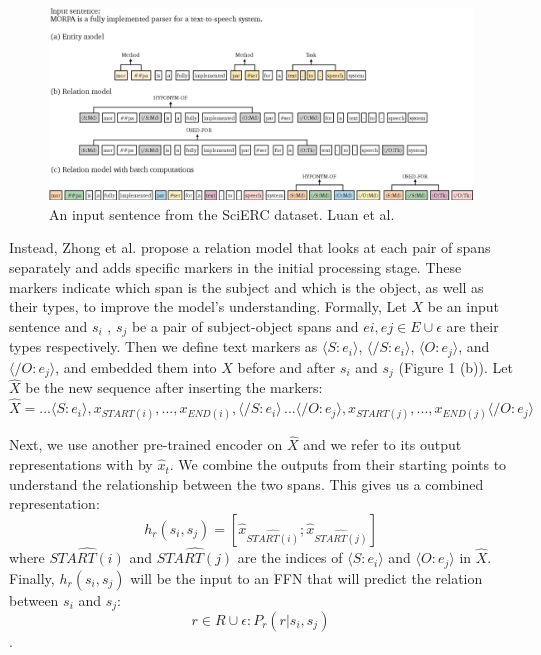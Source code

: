 \begin{figure}[ht]
    \centering
    \includegraphics[width=1\textwidth]{figures/figure1.png}
    \caption{An input sentence from the SciERC dataset. Luan et al. \cite{luan-etal-2019-general}}
    \label{fig:examplefromsciercdataset}
\end{figure}

Instead, Zhong et al. \cite{Zhong2020AFE} propose a relation model that looks at each pair of spans separately and adds specific markers in the initial processing stage. These markers indicate which span is the subject and which is the object, as well as their types, to improve the model's understanding. Formally, Let \(X\) be an input sentence and \(s_i\) , \(s_j\) be a pair of subject-object spans and \(ei , ej \in E \cup {\epsilon}\) are their types respectively. Then we define text markers as \(\langle S:e_i\rangle\), \(\langle /S:e_i\rangle\), \(\langle O:e_j\rangle\), and \(\langle /O:e_j\rangle\), and embedded them into \(X\) before and after \(s_i\) and \(s_j\) (Figure 1 (b)). Let \(\widehat{X}\) be the new sequence after inserting the markers: \[\widehat{X} = ...\langle S:e_i\rangle,x_{START(i)},...,x_{END(i)},\langle /S:e_i\rangle\,...\langle /O:e_j\rangle,x_{START(j)},...,x_{END(j)}\langle /O:e_j\rangle\]

Next, we use another pre-trained encoder on \(\widehat{X}\) and we refer to its output representations with by \(\widehat{x}_t\). We combine the outputs from their starting points to understand the relationship between the two spans. This gives us a combined representation: \[h_r(s_i,s_j)=[{\widehat{x}}_{\widehat{START(i)}};{\widehat{x}}_{\widehat{START(j)}}]\]
where \(\widehat{START(i)}\) and \(\widehat{START(j)}\) are the indices of \(\langle S:e_i\rangle\) and \(\langle O:e_j\rangle\) in \(\widehat{X}\). Finally, \(h_r(s_i,s_j)\) will be the input to an FFN that will predict the relation between \(s_i\) and \(s_j\): \[r \in R \cup {\epsilon}: P_r(r|s_i , s_j )\].

